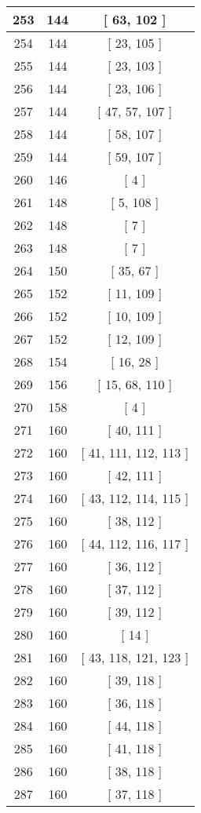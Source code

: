 \begin{center}
\begin{longtable}[H]{|| c c c ||}
\hline
253 & 144 & [ 63, 102 ] \\ 
\hline
254 & 144 & [ 23, 105 ] \\ 
\hline
255 & 144 & [ 23, 103 ] \\ 
\hline
256 & 144 & [ 23, 106 ] \\ 
\hline
257 & 144 & [ 47, 57, 107 ] \\ 
\hline
258 & 144 & [ 58, 107 ] \\ 
\hline
259 & 144 & [ 59, 107 ] \\ 
\hline
260 & 146 & [ 4 ] \\ 
\hline
261 & 148 & [ 5, 108 ] \\ 
\hline
262 & 148 & [ 7 ] \\ 
\hline
263 & 148 & [ 7 ] \\ 
\hline
264 & 150 & [ 35, 67 ] \\ 
\hline
265 & 152 & [ 11, 109 ] \\ 
\hline
266 & 152 & [ 10, 109 ] \\ 
\hline
267 & 152 & [ 12, 109 ] \\ 
\hline
268 & 154 & [ 16, 28 ] \\ 
\hline
269 & 156 & [ 15, 68, 110 ] \\ 
\hline
270 & 158 & [ 4 ] \\ 
\hline
271 & 160 & [ 40, 111 ] \\ 
\hline
272 & 160 & [ 41, 111, 112, 113 ] \\ 
\hline
273 & 160 & [ 42, 111 ] \\ 
\hline
274 & 160 & [ 43, 112, 114, 115 ] \\ 
\hline
275 & 160 & [ 38, 112 ] \\ 
\hline
276 & 160 & [ 44, 112, 116, 117 ] \\ 
\hline
277 & 160 & [ 36, 112 ] \\ 
\hline
278 & 160 & [ 37, 112 ] \\ 
\hline
279 & 160 & [ 39, 112 ] \\ 
\hline
280 & 160 & [ 14 ] \\ 
\hline
281 & 160 & [ 43, 118, 121, 123 ] \\ 
\hline
282 & 160 & [ 39, 118 ] \\ 
\hline
283 & 160 & [ 36, 118 ] \\ 
\hline
284 & 160 & [ 44, 118 ] \\ 
\hline
285 & 160 & [ 41, 118 ] \\ 
\hline
286 & 160 & [ 38, 118 ] \\ 
\hline
287 & 160 & [ 37, 118 ] \\ 

\end{longtable}
\end{center}

